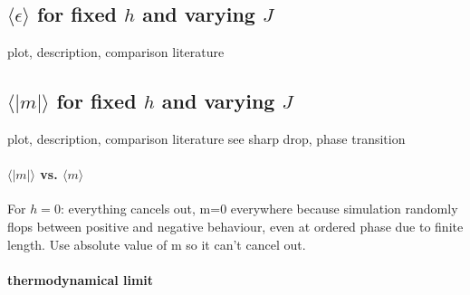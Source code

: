 \documentclass{scrartcl}
\begin{document}
\subsection{$\langle \epsilon\rangle$ for fixed $h$ and varying $J$}
plot, description, comparison literature

\subsection{$\langle |m|\rangle$ for fixed $h$ and varying $J$}
plot, description, comparison literature
see sharp drop, phase transition
\paragraph{$\langle |m|\rangle$ vs. $\langle m\rangle$}
For $h=0$: everything cancels out, m=0 everywhere because simulation randomly flops between positive and negative behaviour, even at ordered phase due to finite length.
Use absolute value of m so it can't cancel out.

\paragraph{thermodynamical limit}



\newpage	
\listoffigures
\printbibliography
\end{document}
